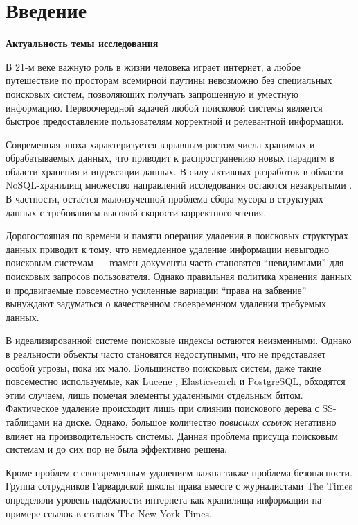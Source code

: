 \newpage
\section{Введение}

\textbf{Актуальность темы исследования}

В 21-м веке важную роль в жизни человека играет интернет, а любое путешествие
по просторам всемирной паутины невозможно без специальных поисковых систем,
позволяющих получать запрошенную и уместную информацию. Первоочередной задачей
любой поисковой системы является быстрое предоставление пользователям
корректной и релевантной информации.

Современная эпоха характеризуется взрывным ростом числа хранимых и обрабатываемых
данных, что приводит к распространению новых парадигм в области хранения и
индексации данных. В силу активных разработок в области NoSQL-хранилищ множество
направлений исследования остаются незакрытыми \cite{No-SQL:IoT}.
В частности, остаётся малоизученной проблема сбора мусора в структурах данных
с требованием высокой скорости корректного чтения.

Дорогостоящая по времени и памяти операция удаления в поисковых структурах данных
приводит к тому, что немедленное удаление информации невыгодно поисковым системам
 — взамен документы часто становятся “невидимыми” для поисковых запросов
пользователя. Однако правильная политика хранения данных \cite{Data_Retention}
и продвигаемые повсеместно усиленные вариации “права на забвение” вынуждают
задуматься о качественном своевременном удалении требуемых данных.

В идеализированной системе поисковые индексы остаются неизменными. Однако в
реальности объекты часто становятся недоступными, что не представляет особой
угрозы, пока их мало. Большинство поисковых систем, даже такие повсеместно
используемые, как Lucene \cite{Lucene:2008}, Elasticsearch\cite{Elasticsearch:2020}
и PostgreSQL\cite{GIN:2020}, обходятся этим случаем, лишь помечая элементы
удаленными отдельным битом. Фактическое удаление происходит лишь при слиянии
поискового дерева с SS-таблицами на диске.
Однако, большое количество \textit{повисших ссылок} негативно влияет на
производительность системы. Данная проблема присуща поисковым
системам и до сих пор не была эффективно решена.

Кроме проблем с своевременным удалением важна также проблема безопасности.
Группа сотрудников Гарвардской школы права вместе с журналистами The Times определяли
уровень надёжности интернета как хранилища информации на примере ссылок в статьях
The New York Times.

